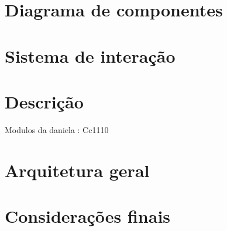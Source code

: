 \section{Diagrama de componentes}




\section{Sistema de interação}


\section{Descrição}


Modulos da daniela : Cc1110



\section{Arquitetura geral}




\newpage












\section{Considerações finais}